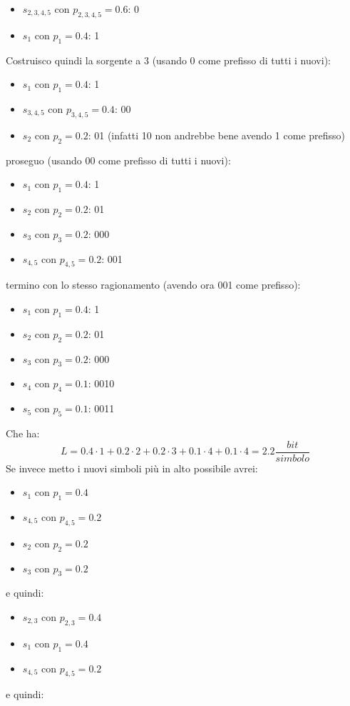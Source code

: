 \documentclass[a4paper,12pt, oneside]{book}
\begin{document}
\begin{esempio}
  \begin{itemize}
    \item $s_{2,3,4,5}$ con $p_{2,3,4,5}=0.6$: 0
    \item $s_1$ con $p_1=0.4$: 1
  \end{itemize}
  Costruisco quindi la sorgente a 3 (usando 0 come prefisso di tutti i nuovi):
  \begin{itemize}
    \item $s_1$ con $p_1=0.4$: 1
    \item $s_{3,4,5}$ con $p_{3,4,5}=0.4$: 00
    \item $s_2$ con $p_2=0.2$: 01 (infatti 10 non andrebbe bene avendo 1 come prefisso)
  \end{itemize}
  proseguo (usando 00 come prefisso di tutti i nuovi):
    \begin{itemize}
    \item $s_1$ con $p_1=0.4$: 1
    \item $s_2$ con $p_2=0.2$: 01
    \item $s_3$ con $p_3=0.2$: 000
    \item $s_{4,5}$ con $p_{4,5}=0.2$: 001
  \end{itemize}
  termino con lo stesso ragionamento (avendo ora 001 come prefisso):
  \begin{itemize}
    \item $s_1$ con $p_1=0.4$: 1
    \item $s_2$ con $p_2=0.2$: 01
    \item $s_3$ con $p_3=0.2$: 000
    \item $s_4$ con $p_4=0.1$: 0010
    \item $s_5$ con $p_5=0.1$: 0011
  \end{itemize}
  Che ha:
  \[L=0.4\cdot 1+0.2\cdot 2+0.2\cdot 3+0.1\cdot 4+0.1\cdot 4 =
    2.2\frac{bit}{simbolo}\]
  Se invece metto i nuovi simboli più in alto possibile avrei:
  \begin{itemize}
    \item $s_1$ con $p_1=0.4$
    \item $s_{4,5}$ con $p_{4,5}=0.2$
    \item $s_2$ con $p_2=0.2$
    \item $s_3$ con $p_3=0.2$
  \end{itemize}
  e quindi:

  \begin{itemize}
    \item $s_{2,3}$ con $p_{2,3}=0.4$
    \item $s_1$ con $p_1=0.4$
    \item $s_{4,5}$ con $p_{4,5}=0.2$
  \end{itemize}
  e quindi:


\end{esempio}
\end{document}
